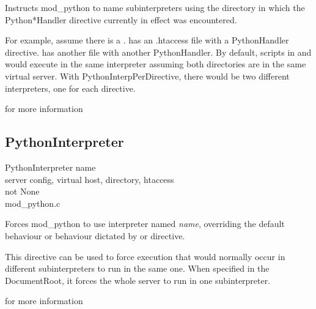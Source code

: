 Instructs mod_python to name subinterpreters using the directory in
which the Python*Handler directive currently in effect was
encountered.

For example, assume there is a
.  has an .htaccess
file with a PythonHandler directive.  
has another  file with another PythonHandler. By
default, scripts in  and
 would execute in the same interpreter
assuming both directories are in the same virtual server. With
PythonInterpPerDirective, there would be two different interpreters,
one for each directive.

\begin{seealso}
           {for more information}
\end{seealso}

\subsection{PythonInterpreter\label{dir-other-pi}}

PythonInterpreter name \\
server config, virtual host, directory, htaccess\\
not None\\
mod_python.c

Forces mod_python to use interpreter named \emph{name}, overriding the
default behaviour or behaviour dictated by
 or
 directive.

This directive can be used to force execution that would normally
occur in different subinterpreters to run in the same one. When
specified in the DocumentRoot, it forces the whole server to run in one
subinterpreter.

\begin{seealso}
           {for more information}
\end{seealso}


